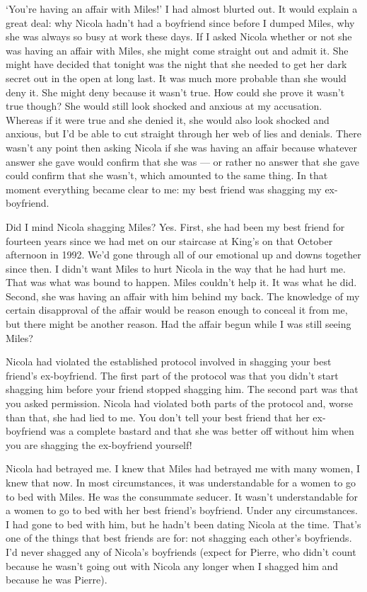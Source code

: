 `You're having an affair with Miles!' I had almost blurted out. It
would explain a great deal: why Nicola hadn't had a boyfriend since before I dumped Miles, why
she was always so {\twelveit busy\/} at work these days. If I asked Nicola whether or not she was having an
affair with Miles, she might come straight out and admit it. She
might have decided that tonight was the night that she needed to get
her dark secret out in the open at long last. It was much more probable than she
would deny it. She might deny because it wasn't true. How could she
prove it wasn't true though? She would still look shocked and
anxious at my accusation. Whereas if it were true and she denied it, she would also look
shocked and anxious, but I'd be able to cut straight through her web
of lies and denials. There wasn't any point then asking Nicola if
she was having an affair because whatever answer she gave would
confirm that she was --- or rather no answer that she gave could
confirm that she {\twelveit wasn't}, which amounted to the same thing. In that
moment everything became clear to me: my best friend was shagging my
ex-boyfriend.

Did I mind Nicola shagging Miles? Yes. First, she had been my best
friend for fourteen years since we had met on our
staircase at King's on that October afternoon in 1992. We'd gone through all of our emotional up and downs together since then. I didn't want Miles to hurt Nicola in the way that he had hurt me. That was what was bound to happen.
Miles couldn't help it. It was what he did. Second, she was having an
affair with him {\twelveit behind my back}. The knowledge of my certain disapproval of the affair would be reason enough to conceal it from me, but there might be another reason. Had the affair begun while I was
still seeing Miles?

Nicola had violated the established protocol
involved in shagging your best friend's ex-boyfriend. The first part
of the protocol was that you didn't start shagging him before your
friend stopped shagging him. The second part was that you
asked permission. Nicola had violated both parts of the protocol and,
worse than that, she had lied to me. You don't tell your best friend
that her ex-boyfriend was a complete bastard and that she was better
off without him {\twelveit when you are shagging the ex-boyfriend yourself!}

Nicola had betrayed me. I knew that Miles had betrayed me
with many women, I knew that now. In most circumstances, it was understandable for a women
to go to bed with Miles. He was the consummate seducer.
It wasn't understandable for a women to go
to bed with her best friend's boyfriend. Under any circumstances. I had gone to bed with him, but he hadn't been dating Nicola at the time.
That's one of the things that best friends are for: not shagging
each other's boyfriends. I'd never shagged any of Nicola's
boyfriends (expect for Pierre, who didn't count because he wasn't
going out with Nicola any longer when I shagged him and because he
was {\twelveit Pierre}).

